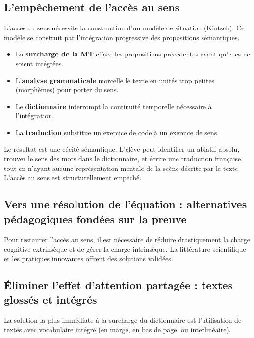 \subsection{L'empêchement de l'accès au sens}

L'accès au sens nécessite la construction d'un \og modèle de situation\fg{} (Kintsch). Ce modèle se
construit par l'intégration progressive des propositions sémantiques.

\begin{itemize}\item La \textbf{surcharge de la MT} efface les propositions précédentes avant qu'elles ne soient intégrées.\item L'\textbf{analyse grammaticale} morcelle le texte en unités trop petites (morphèmes) pour porter du sens.\item Le \textbf{dictionnaire} interrompt la continuité temporelle nécessaire à l'intégration.\item La \textbf{traduction} substitue un exercice de code à un exercice de sens.\end{itemize}Le résultat est une \og cécité sémantique\fg{}. L'élève peut identifier un ablatif absolu, trouver
le sens des mots dans le dictionnaire, et écrire une traduction française, tout en n'ayant aucune
représentation mentale de la scène décrite par le texte. L'accès au sens est structurellement
empêché.\cite{II-1-3-ref40}



\subsection{Vers une résolution de l'équation : alternatives pédagogiques fondées sur la preuve}

Pour restaurer l'accès au sens, il est nécessaire de réduire drastiquement la charge cognitive
extrinsèque et de gérer la charge intrinsèque. La littérature scientifique et les pratiques
innovantes offrent des solutions validées.



\subsection{Éliminer l'effet d'attention partagée : textes glossés et intégrés}

La solution la plus immédiate à la surcharge du dictionnaire est l'utilisation de textes avec
vocabulaire intégré (en marge, en bas de page, ou interlinéaire).

